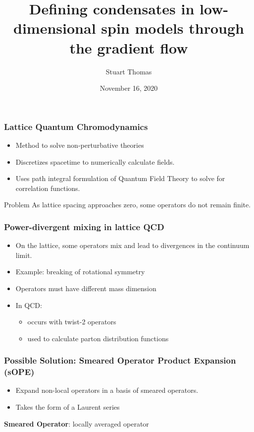 \documentclass{beamer}
\title[Short title]{Defining condensates in low-dimensional spin models through the gradient flow} %
\author{Stuart Thomas} %
\institute[W\&M] %
{
Christopher Monahan \\ %
\medskip
}
\date{November 16, 2020} %
\begin{document}
\begin{frame}
\titlepage %
\end{frame}


\begin{frame}
\frametitle{Lattice Quantum Chromodynamics}
\begin{itemize}
    \item Method to solve non-perturbative theories
    \item Discretizes spacetime to numerically calculate fields.
    \item Uses path integral formulation of Quantum Field Theory to solve for correlation functions.
\end{itemize}

\begin{block}{Problem}
    As lattice spacing approaches zero, some operators do not remain finite. 
\end{block}
\end{frame}


\begin{frame}
\frametitle{Power-divergent mixing in lattice QCD}
\begin{itemize}
    \item On the lattice, some operators mix and lead to divergences in the continuum limit.
    \item Example: breaking of rotational symmetry
    \item Operators must have different mass dimension
    \item In QCD:
        \begin{itemize}
            \item occurs with twist-2 operators
            \item used to calculate parton distribution functions
        \end{itemize}
\end{itemize}
\end{frame}

\begin{frame}
    \frametitle{Possible Solution: Smeared Operator Product Expansion (sOPE) }
    \begin{itemize}
        \item Expand non-local operators in a basis of smeared operators.
        \item Takes the form of a Laurent series
    \end{itemize}
    \textbf{Smeared Operator}: locally averaged operator
\end{frame}
\end{document}
